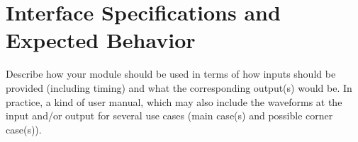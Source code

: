 \chapter{Interface Specifications and Expected Behavior}\label{chapter:4}
Describe how your module should be used in terms of how inputs should be provided (including timing) and what the corresponding output(s) would be. In practice, a kind of user manual, which may also include the waveforms at the input and/or output for several use cases (main case(s) and possible corner case(s)).
